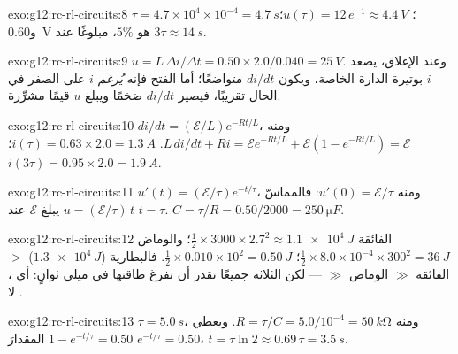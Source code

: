 \begin{solution}{exo:g12:rc-rl-circuits:8}
$\tau = 4.7\times10^{4} \times 10^{-4} = \qty{4.7}{s}$؛
$u(\tau) = 12\,e^{-1} \approx \qty{4.4}{V}$؛ و\qty{0.60}{V} هو $5\%$،
مبلوغًا عند $3\tau \approx \qty{14}{s}$.
\end{solution}

\begin{solution}{exo:g12:rc-rl-circuits:9}
$u = L\,\Delta i/\Delta t = 0.50 \times 2.0/0.040 = \qty{25}{V}$.
وعند الإغلاق، يصعد $i$ بوتيرة الدارة الخاصة، ويكون $di/dt$ متواضعًا؛ أما الفتح
فإنه \emph{يُرغم} $i$ على الصفر في الحال تقريبًا، فيصير $di/dt$ ضخمًا ويبلغ $u$
قيمًا مشرِّرة.
\end{solution}

\begin{solution}{exo:g12:rc-rl-circuits:10}
$di/dt = (\mathcal{E}/L)e^{-Rt/L}$، ومنه $L\,di/dt + Ri =
\mathcal{E}e^{-Rt/L} + \mathcal{E}(1 - e^{-Rt/L}) = \mathcal{E}$.
$i(\tau) = 0.63 \times 2.0 = \qty{1.3}{A}$؛
$i(3\tau) = 0.95 \times 2.0 = \qty{1.9}{A}$.
\end{solution}

\begin{solution}{exo:g12:rc-rl-circuits:11}
$u'(t) = (\mathcal{E}/\tau)e^{-t/\tau}$، ومنه $u'(0) = \mathcal{E}/\tau$:
فالمماسّ $u = (\mathcal{E}/\tau)\,t$ يبلغ $\mathcal{E}$ عند
$t = \tau$. $C = \tau/R = 0.50/2000 = \qty{250}{\micro F}$.
\end{solution}

\begin{solution}{exo:g12:rc-rl-circuits:12}
 الفائقة $\tfrac12 \times 3000 \times 2.7^2 \approx \qty{1.1e4}{J}$؛
والوماض $\tfrac12 \times 8.0\times10^{-4} \times 300^2 = \qty{36}{J}$؛
 $\tfrac12 \times 0.010 \times 10^2 = \qty{0.50}{J}$. فالبطارية
($\qty{1.3e4}{J}$) $>$  الفائقة $\gg$ الوماض $\gg$  --- لكن الثلاثة
جميعًا تقدر أن تفرغ طاقتها في ميلي ثوانٍ: أي ، لا .
\end{solution}

\begin{solution}{exo:g12:rc-rl-circuits:13}
$\tau = \qty{5.0}{s}$، ومنه $R = \tau/C = 5.0/10^{-4} = \qty{50}{k\ohm}$.
ويعطي $1 - e^{-t/\tau} = 0.50$ المقدارَ $e^{-t/\tau} = 0.50$، $t = \tau\ln 2
\approx 0.69\,\tau = \qty{3.5}{s}$.
\end{solution}

